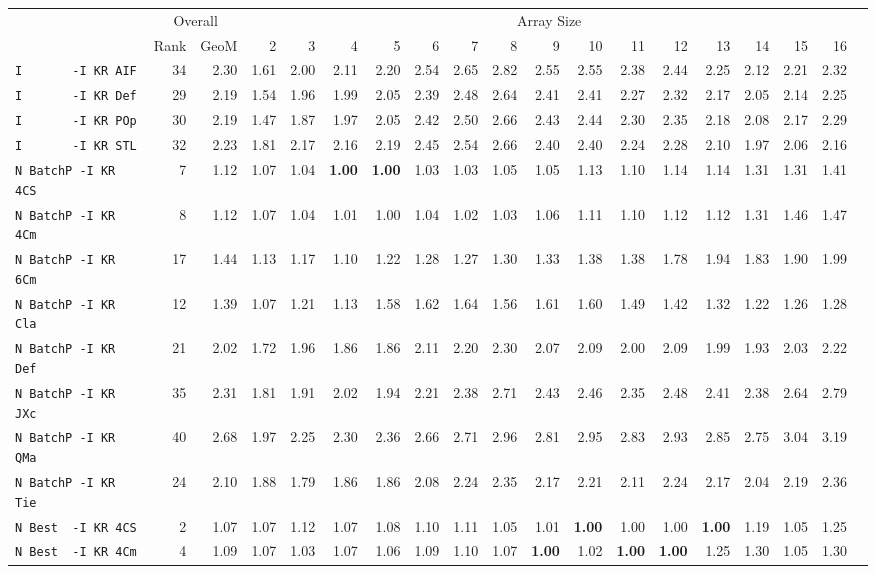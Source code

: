 \begin{tabular}{l | r @{~~} r | r@{~~}r@{~~}r@{~~}r@{~~}r@{~~}r@{~~}r@{~~}r@{~~}r@{~~}r@{~~}r@{~~}r@{~~}r@{~~}r@{~~}r@{~~}r|}
 & \multicolumn{2}{c}{Overall} & \multicolumn{15}{c}{Array Size} \\
 & Rank & GeoM & 2&3&4&5&6&7&8&9&10&11&12&13&14&15&16\\ \hline
\verb+I       -I KR AIF+ & 34 & 2.30 & 1.61&2.00&2.11&2.20&2.54&2.65&2.82&2.55&2.55&2.38&2.44&2.25&2.12&2.21&2.32\\
\verb+I       -I KR Def+ & 29 & 2.19 & 1.54&1.96&1.99&2.05&2.39&2.48&2.64&2.41&2.41&2.27&2.32&2.17&2.05&2.14&2.25\\
\verb+I       -I KR POp+ & 30 & 2.19 & 1.47&1.87&1.97&2.05&2.42&2.50&2.66&2.43&2.44&2.30&2.35&2.18&2.08&2.17&2.29\\
\verb+I       -I KR STL+ & 32 & 2.23 & 1.81&2.17&2.16&2.19&2.45&2.54&2.66&2.40&2.40&2.24&2.28&2.10&1.97&2.06&2.16\\
\verb+N BatchP -I KR 4CS+ & 7 & 1.12 & 1.07&1.04&\textbf{1.00}&\textbf{1.00}&1.03&1.03&1.05&1.05&1.13&1.10&1.14&1.14&1.31&1.31&1.41\\
\verb+N BatchP -I KR 4Cm+ & 8 & 1.12 & 1.07&1.04&1.01&1.00&1.04&1.02&1.03&1.06&1.11&1.10&1.12&1.12&1.31&1.46&1.47\\
\verb+N BatchP -I KR 6Cm+ & 17 & 1.44 & 1.13&1.17&1.10&1.22&1.28&1.27&1.30&1.33&1.38&1.38&1.78&1.94&1.83&1.90&1.99\\
\verb+N BatchP -I KR Cla+ & 12 & 1.39 & 1.07&1.21&1.13&1.58&1.62&1.64&1.56&1.61&1.60&1.49&1.42&1.32&1.22&1.26&1.28\\
\verb+N BatchP -I KR Def+ & 21 & 2.02 & 1.72&1.96&1.86&1.86&2.11&2.20&2.30&2.07&2.09&2.00&2.09&1.99&1.93&2.03&2.22\\
\verb+N BatchP -I KR JXc+ & 35 & 2.31 & 1.81&1.91&2.02&1.94&2.21&2.38&2.71&2.43&2.46&2.35&2.48&2.41&2.38&2.64&2.79\\
\verb+N BatchP -I KR QMa+ & 40 & 2.68 & 1.97&2.25&2.30&2.36&2.66&2.71&2.96&2.81&2.95&2.83&2.93&2.85&2.75&3.04&3.19\\
\verb+N BatchP -I KR Tie+ & 24 & 2.10 & 1.88&1.79&1.86&1.86&2.08&2.24&2.35&2.17&2.21&2.11&2.24&2.17&2.04&2.19&2.36\\
\verb+N Best  -I KR 4CS+ & 2 & 1.07 & 1.07&1.12&1.07&1.08&1.10&1.11&1.05&1.01&\textbf{1.00}&1.00&1.00&\textbf{1.00}&1.19&1.05&1.25\\
\verb+N Best  -I KR 4Cm+ & 4 & 1.09 & 1.07&1.03&1.07&1.06&1.09&1.10&1.07&\textbf{1.00}&1.02&\textbf{1.00}&\textbf{1.00}&1.25&1.30&1.05&1.30\\

\end{tabular}
